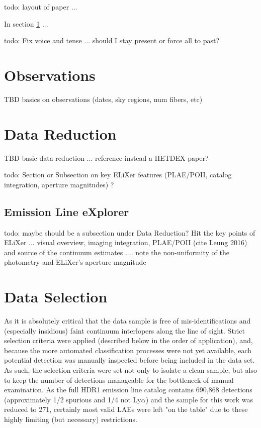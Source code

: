 \documentclass{aastex62}
\begin{document}
{ \color{red} todo: layout of paper ...}

In section \ref{sec:obs} ...


{ \color{red} todo: Fix voice and tense ... should I stay present or force all to past?}

\section{Observations} \label{sec:obs}

TBD basics on observations (dates, sky regions, num fibers, etc)

\section{Data Reduction} \label{sec:reduction}

TBD basic data reduction ... reference instead a HETDEX paper?

{ \color{red} todo: Section or Subsection on key ELiXer features (PLAE/POII, catalog integration, aperture magnitudes) ?}

\subsection{Emission Line eXplorer} \label{sec:elixer}
{ \color{red} todo: maybe should be a subsection under Data Reduction? Hit the key points of ELiXer ... visual overview, imaging integration, PLAE/POII (cite Leung 2016) and source of the continuum estimates .... note the non-uniformity of the photometry and ELiXer's aperture magnitude }


\section{Data Selection} \label{sec:selection}

As it is absolutely critical that the data sample is free of mis-identifications and (especially insidious) faint continuum interlopers along the line of sight. Strict selection criteria were applied (described below in the order of application), and, because the more automated classification processes were not yet available, each potential detection was manually inspected before being included in the data set. As such, the selection criteria were set not only to isolate a clean sample, but also to keep the number of detections manageable for the bottleneck of manual examination. As the full HDR1 emission line catalog contains 690,868 detections (approximately 1/2 spurious and 1/4 not Ly$\alpha$) and the sample for this work was reduced to 271, certainly most valid LAEs were left "on the table" due to these highly limiting (but necessary) restrictions. 
\end{document}
